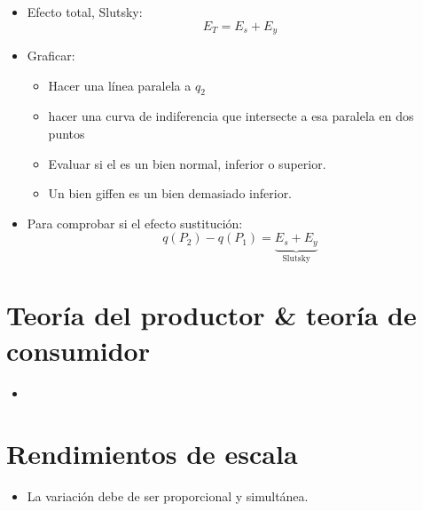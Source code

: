 \begin{itemize}
    \item Efecto total, Slutsky: 
        \[
          E_T = E_s + E_y
        \]
    
    \item Graficar:
        \begin{itemize}
            \item Hacer una línea paralela a $q_2$
            \item hacer una curva de indiferencia que intersecte a esa paralela en dos puntos
            \item Evaluar si el es un bien normal, inferior o superior.
            \item Un bien giffen es un bien demasiado inferior.
        \end{itemize}
    
    \item Para comprobar si el efecto sustitución:
        \[
          q(P_2) - q(P_1) = \underbrace{E_s + E_y }_{\text{Slutsky} }
        \]
\end{itemize}


\section{Teoría del productor \& teoría de consumidor}
\begin{itemize}
    \item 
\end{itemize}


\section{Rendimientos de escala}
\begin{itemize}
    \item La variación debe de ser proporcional y simultánea.
\end{itemize}

